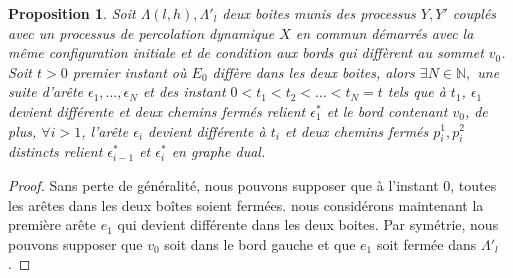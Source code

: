 \documentclass[titlepage,a4paper,12pt]{article}
\newcounter{prop}
\newtheorem{chaine}[prop]{Proposition}
\begin{document}
\begin{chaine}
\label{chaine}
Soit $\Lambda(l,h), \Lambda'_l$ deux boites munis des processus $Y,Y'$ couplés avec un processus de percolation dynamique $X$ en commun démarrés avec la même configuration initiale et de condition aux bords qui diffèrent au sommet $v_0$. Soit $t>0$ premier instant où $E_0$ diffère dans les deux boites, alors $\exists N\in \mathbb{N},$ une suite d'arête $\epsilon_1,\dots,\epsilon_N$ et des instant $0<t_1< t_2<\dots<t_N=t$ tels que à $t_1$, $\epsilon_1$ devient différente et deux chemins fermés relient $\epsilon_1^*$ et le bord contenant $v_0$, de plus, $\forall i>1$, l'arête $\epsilon_i$ devient différente à $t_i$ et deux chemins fermés $p_i^1,p_i^2$ distincts relient $\epsilon_{i-1}^*$ et $\epsilon_i^*$ en graphe dual.
\end{chaine}
\begin{proof}
Sans perte de généralité, nous pouvons supposer que à l'instant 0, toutes les arêtes dans les deux boîtes soient fermées. nous considérons maintenant la première arête $e_1$ qui devient différente dans les deux boites. Par symétrie, nous pouvons supposer que $v_0$ soit dans le bord gauche et que $e_1$ soit fermée dans $\Lambda'_l$.


\end{proof}
\end{document}
